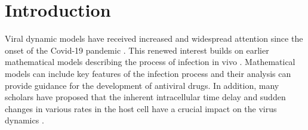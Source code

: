 \documentclass{CMHPhD-SIVD}
\begin{document}

\linenumbers

\section{Introduction}
Viral dynamic models have received increased and widespread attention since the onset of the Covid-19 pandemic \cite{tang2022controlling,wang2021effects,zu2021investigating}.
This renewed interest builds on earlier mathematical models describing the process of infection in vivo \cite{li2012joint,mojaver2015mathematical,pan2019rich,smith2003virus,wang2006mathematical}.
Mathematical models can include key features of the infection process and their analysis can provide guidance for the development of antiviral drugs. {} In addition, many scholars have proposed that the inherent intracellular time delay and sudden changes in various rates in the host cell have a crucial impact on the virus dynamics \cite{culshaw2000delay,huang2010lyapunov,lu2021mathematical,pertsev2019stochastic,shu2015delay,vargas2012stability}.
\end{document}
